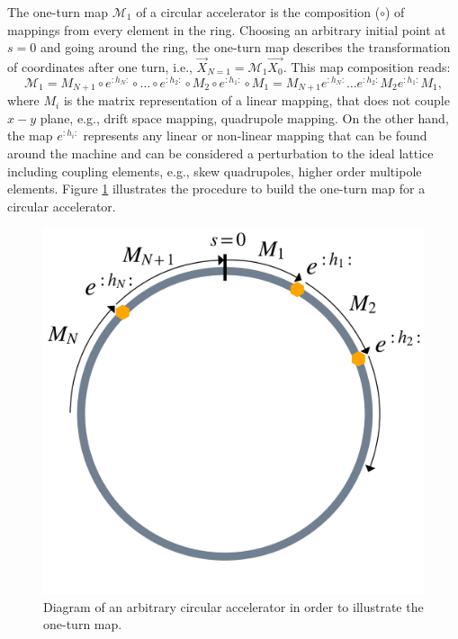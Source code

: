 The one-turn map $\mathcal{M}_1$ of a circular accelerator is the composition ($\circ$) of mappings from every element in the ring. Choosing an arbitrary initial point at $s=0$ and going around the ring, the one-turn map describes the transformation of coordinates after one turn, i.e., $\vec{X}_{N=1}=\mathcal{M}_1 \vec{X_0}$. This map composition reads:
\begin{equation}
    \label{eq:oneturnmap}
    \mathcal{M}_1=M_{N+1} \circ e^{:h_N:} \circ \dots \circ e^{:h_2:} \circ M_2 \circ e^{:h_1:} \circ M_1 = M_{N+1}e^{:h_N:} \dots e^{:h_2:}M_2 e^{:h_1:}M_1,
\end{equation}
where $M_i$ is the matrix representation of a linear mapping, that does not couple $x-y$ plane, e.g., drift space mapping, quadrupole mapping. On the other hand, the map $e^{:h_i:}$ represents any linear or non-linear mapping that can be found around the machine and can be considered a perturbation to the ideal lattice including coupling elements, e.g., skew quadrupoles, higher order multipole elements. Figure \ref{fig:oneturn} illustrates the procedure to build the one-turn map for a circular accelerator. 

\begin{figure}[H]
    \centering
    \includegraphics[width=0.7\columnwidth]{chapter2/oneturn.png}
    \caption{Diagram of an arbitrary circular accelerator in order to illustrate the one-turn map.}
    \label{fig:oneturn}
 \end{figure}

